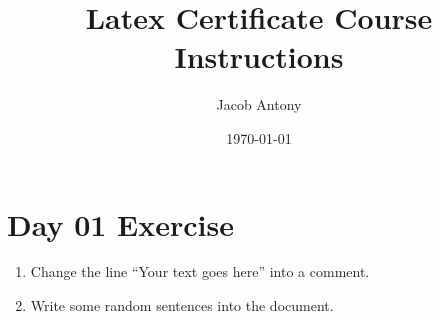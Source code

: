 \documentclass{article}
\title{Latex Certificate Course Instructions}
\author{Jacob Antony}
\date{\today}
\begin{document}
\maketitle

\section{Day 01 Exercise}
\begin{enumerate}
	\item Change the line ``Your text goes here'' into a comment.
	\item Write some random sentences into the document. 
\end{enumerate}

\end{document}
